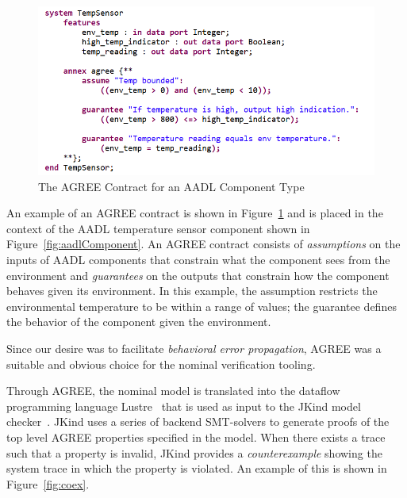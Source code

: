 \begin{figure}[h!]
	\begin{center}
	\includegraphics[width=1.0\textwidth]{images/agreeContract2.png}
	\caption{The AGREE Contract for an AADL Component Type}
	\label{fig:agreeContract}
	\end{center}
\end{figure}

An example of an AGREE contract is shown in Figure~\ref{fig:agreeContract} and is placed in the context of the AADL temperature sensor component shown in Figure~\ref{fig:aadlComponent}.  An AGREE contract consists of {\em assumptions} on the inputs of AADL components that constrain what the component sees from the environment and {\em guarantees} on the outputs that constrain how the component behaves given its environment. In this example, the assumption restricts the environmental temperature to be within a range of values; the guarantee defines the behavior of the component given the environment. 

Since our desire was to facilitate {\em behavioral error propagation}, AGREE was a suitable and obvious choice for the nominal verification tooling. 

Through AGREE, the nominal model is translated into the dataflow programming language Lustre~\cite{Halbwachs91:IEEE} that is used as input to the JKind model checker~\cite{2017arXiv171201222G}. JKind uses a series of backend SMT-solvers to generate proofs of the top level AGREE properties specified in the model. When there exists a trace such that a property is invalid, JKind provides a {\em counterexample} showing the system trace in which the property is violated. An example of this is shown in Figure~\ref{fig:coex}. 

